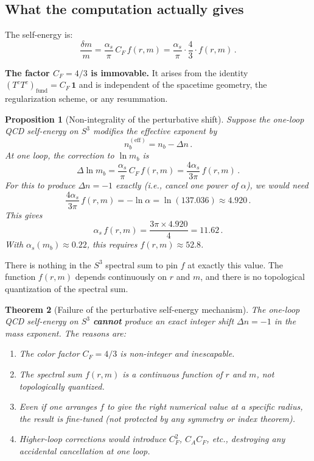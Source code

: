 \documentclass[11pt,a4paper]{article}
\newtheorem{theorem}{Theorem}
\newtheorem{proposition}[theorem]{Proposition}
\theoremstyle{definition}
\theoremstyle{remark}
\begin{document}
\subsection{What the computation actually gives}

The self-energy is:
\begin{equation}\label{eq:actual}
\frac{\delta m}{m} = \frac{\alpha_s}{\pi}\,C_F\,f(r,m)
= \frac{\alpha_s}{\pi}\cdot\frac{4}{3}\cdot f(r,m)\,.
\end{equation}

\textbf{The factor $C_F = 4/3$ is immovable.}  It arises from the
identity $(T^c T^c)_{\mathrm{fund}} = C_F\,\mathbf{1}$ and is independent
of the spacetime geometry, the regularization scheme, or any resummation.

\begin{proposition}[Non-integrality of the perturbative shift]
\label{prop:non-integer}
Suppose the one-loop QCD self-energy on $S^3$ modifies the effective
exponent by
\[
n_b^{(\mathrm{eff})} = n_b - \Delta n\,.
\]
At one loop, the correction to $\ln m_b$ is
\[
\Delta\ln m_b = \frac{\alpha_s}{\pi}\,C_F\,f(r,m)
= \frac{4\alpha_s}{3\pi}\,f(r,m)\,.
\]
For this to produce $\Delta n = -1$ exactly (i.e., cancel one power of
$\alpha$), we would need
\[
\frac{4\alpha_s}{3\pi}\,f(r,m) = -\ln\alpha = \ln(137.036) \approx 4.920\,.
\]
This gives
\[
\alpha_s\,f(r,m) = \frac{3\pi\times 4.920}{4} = 11.62\,.
\]
With $\alpha_s(m_b) \approx 0.22$, this requires $f(r,m) \approx 52.8$.
\end{proposition}

There is nothing in the $S^3$ spectral sum to pin $f$ at exactly this value.
The function $f(r,m)$ depends continuously on $r$ and $m$, and there is
no topological quantization of the spectral sum.

\begin{theorem}[Failure of the perturbative self-energy mechanism]
\label{thm:failure}
The one-loop QCD self-energy on $S^3$ \textbf{cannot} produce an exact
integer shift $\Delta n = -1$ in the mass exponent.  The reasons are:
\begin{enumerate}
\item The color factor $C_F = 4/3$ is non-integer and inescapable.
\item The spectral sum $f(r,m)$ is a continuous function of $r$ and $m$,
not topologically quantized.
\item Even if one arranges $f$ to give the right numerical value at a
specific radius, the result is fine-tuned (not protected by any
symmetry or index theorem).
\item Higher-loop corrections would introduce $C_F^2$, $C_A C_F$,
etc., destroying any accidental cancellation at one loop.
\end{enumerate}
\end{theorem}
\end{document}

